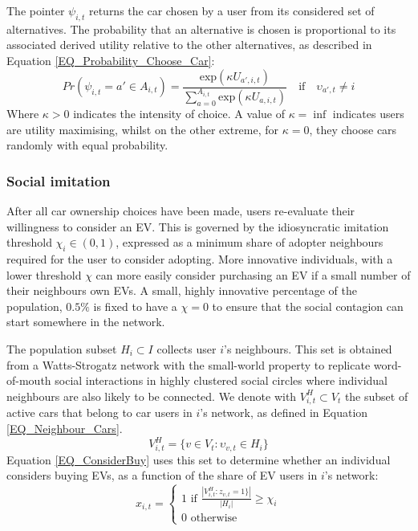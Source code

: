 \documentclass[12pt]{article}
\begin{document}
	The pointer $\psi_{i,t}$ returns the car chosen by a user from its considered set of alternatives. The probability that an alternative is chosen is proportional to its associated derived utility relative to the other alternatives, as described in Equation \ref{EQ_Probability_Choose_Car}:
	\begin{equation}
		Pr(\psi_{i,t}=a'\in{A_{i,t}}) =
		\frac{ \text{exp}(\kappa U_{a',i,t})}{\sum_{a=0}^{A_{i,t}} \text{exp}(\kappa U_{a,i,t})}\quad\text{if}\quad\upsilon_{a',t}\neq{i}
		\label{EQ_Probability_Choose_Car}
	\end{equation}
	Where $\kappa>0$ indicates the intensity of choice. A value of $\kappa = \inf$ indicates users are utility maximising, whilst on the other extreme, for $\kappa = 0$, they choose cars randomly with equal probability. \\

	\subsubsection{Social imitation} \label{Users_SocialImitation}
	After all car ownership choices have been made, users re-evaluate their willingness to consider an EV. This is governed by the idiosyncratic imitation threshold $\chi_i\in(0,1)$, expressed as a minimum share of adopter neighbours required for the user to consider adopting. More innovative individuals, with a lower threshold $\chi$ can more easily consider purchasing an EV if a small number of their neighbours own EVs. A small, highly innovative percentage of the population, $0.5\%$ is fixed to have a $\chi = 0$ to ensure that the social contagion can start somewhere in the network.

    The population subset $H_i\subset{I}$ collects user $i$'s neighbours. This set is obtained from a Watts-Strogatz network with the small-world property to replicate word-of-mouth social interactions in highly clustered social circles where individual neighbours are also likely to be connected. We denote with $V^H_{i,t}\subset{V_t}$ the subset of active cars that belong to car users in $i$'s network, as defined in Equation \ref{EQ_Neighbour_Cars}.
	\begin{equation}
		V^H_{i,t} = \{v \in V_t : \upsilon_{v,t} \in H_i\}
		\label{EQ_Neighbour_Cars}
	\end{equation}
	Equation \ref{EQ_ConsiderBuy} uses this set to determine whether an individual considers buying EVs, as a function of the share of EV users in $i$'s network:
	\begin{equation}
		x_{i,t} = \begin{cases}
			1\text{ if }\frac{|V^H_{i,t}:z_{v,t}=1\}|}{|H_i|}\geq \chi_{i}\\
			0\text{ otherwise}
		\end{cases}
		\label{EQ_ConsiderBuy}
	\end{equation}
\end{document}
